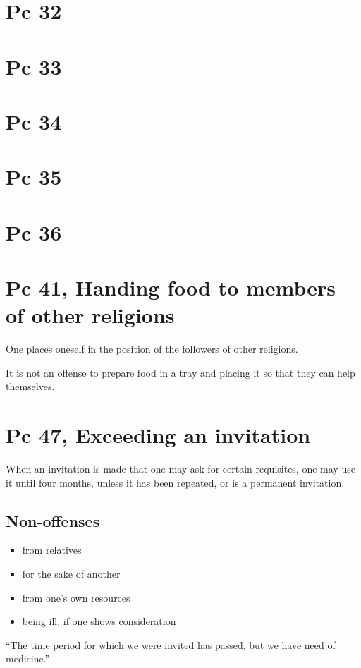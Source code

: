 \section{Pc 32}

\section{Pc 33}

\section{Pc 34}

\section{Pc 35}

\section{Pc 36}

\section{Pc 41, Handing food to members of other religions}

One places oneself in the position of the followers of other religions.

It is not an offense to prepare food in a tray and placing it so that
they can help themselves.

\section{Pc 47, Exceeding an invitation}

When an invitation is made that one may ask for certain requisites, one
may use it until four months, unless it has been repeated, or is a
permanent invitation.

\subsection{Non-offenses}

\begin{multicols}{2}

\begin{itemize}
\tightlist
\item
  from relatives
\item
  for the sake of another
\item
  from one's own resources
\item
  being ill, if one shows consideration
\end{itemize}

\end{multicols}

``The time period for which we were invited has passed, but we have need
of medicine.''

